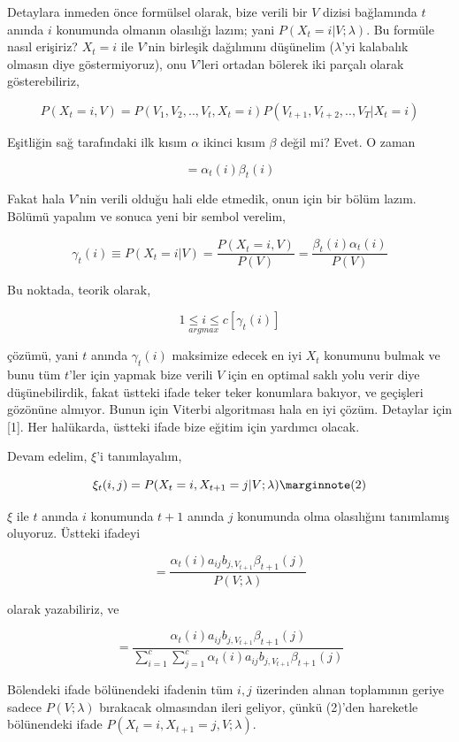 \documentclass[12pt,fleqn]{article}\usepackage{../../common}
\begin{document}
Detaylara inmeden önce formülsel olarak, bize verili bir $V$ dizisi
bağlamında $t$ anında $i$ konumunda olmanın olasılığı lazım; yani 
$P(X_t = i | V; \lambda)$. Bu formüle nasıl erişiriz? $X_t = i$ ile $V$'nin
birleşik dağılımını düşünelim ($\lambda$'yi kalabalık olmasın diye
göstermiyoruz), onu $V$'leri ortadan bölerek iki parçalı olarak 
gösterebiliriz,

$$
P(X_t = i, V) = P( V_1,V_2,..,V_t,X_t=i) P (V_{t+1},V_{t+2},..,V_T | X_t=i )
$$

Eşitliğin sağ tarafındaki ilk kısım $\alpha$ ikinci kısım $\beta$ değil mi?
Evet. O zaman 

$$  = \alpha_t(i) \beta_t(i) $$

Fakat hala $V$'nin verili olduğu hali elde etmedik, onun için bir bölüm
lazım. Bölümü yapalım ve sonuca yeni bir sembol verelim,

$$ 
\gamma_t(i) \equiv P(X_t = i | V) = 
\frac{P(X_t = i, V) }{P(V)} = 
\frac{\beta_t(i)\alpha_t(i)}{ P(V)} 
$$

Bu noktada, teorik olarak, 

$$ \underset{argmax}{1 \le i \le c} [ \gamma_t(i) ] $$

çözümü, yani $t$ anında $\gamma_t(i)$ maksimize edecek en iyi $X_t$
konumunu bulmak ve bunu tüm $t$'ler için yapmak bize verili $V$ için en
optimal saklı yolu verir diye düşünebilirdik, fakat üstteki ifade teker
teker konumlara bakıyor, ve geçişleri gözönüne almıyor. Bunun için Viterbi
algoritması hala en iyi çözüm. Detaylar için [1]. Her halükarda, üstteki
ifade bize eğitim için yardımcı olacak. 

Devam edelim, $\xi$'i tanımlayalım,

$$
\xi_t(i,j) = P(X_t = i, X_{t+1}= j | V; \lambda) 
\mlabel{2}
$$

$\xi$ ile $t$ anında $i$ konumunda $t+1$ anında $j$ konumunda olma
olasılığını tanımlamış oluyoruz. Üstteki ifadeyi 

$$  = \frac{\alpha_t(i)a_{ij}b_{j,V_{t+1}}\beta_{t+1}(j)  }{P(V;\lambda)}$$

olarak yazabiliriz, ve

$$  
= \frac{\alpha_t(i)a_{ij}b_{j,V_{t+1}}\beta_{t+1}(j)  }
{\sum_{i=1}^{c}\sum_{j=1}^{c} \alpha_t(i)a_{ij}b_{j,V_{t+1}}\beta_{t+1}(j)  }
$$

Bölendeki ifade bölünendeki ifadenin tüm $i,j$ üzerinden alınan toplamının
geriye sadece $P(V;\lambda)$ bırakacak olmasından ileri geliyor, çünkü (2)'den
hareketle bölünendeki ifade $P(X_t = i, X_{t+1}= j, V; \lambda)$. 
\end{document}
